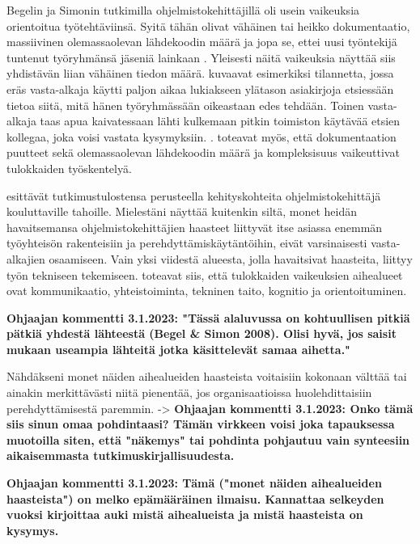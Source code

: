 \documentclass[utf8]{gradu3}
\begin{document}
Begelin ja Simonin tutkimilla ohjelmistokehittäjillä oli usein vaikeuksia orientoitua työtehtäviinsä. Syitä tähän olivat vähäinen tai heikko dokumentaatio, massiivinen olemassaolevan lähdekoodin määrä ja jopa se, ettei uusi työntekijä tuntenut työryhmänsä jäseniä lainkaan \parencite{begel-simon-2008}. Yleisesti näitä vaikeuksia näyttää siis yhdistävän liian vähäinen tiedon määrä. \textcite{begel-simon-2008} kuvaavat esimerkiksi tilannetta, jossa eräs vasta-alkaja käytti paljon aikaa lukiakseen ylätason asiakirjoja etsiessään tietoa siitä, mitä hänen työryhmässään oikeastaan edes tehdään. Toinen vasta-alkaja taas apua kaivatessaan lähti kulkemaan pitkin toimiston käytävää etsien kollegaa, joka voisi vastata kysymyksiin. \parencite{begel-simon-2008}. \textcite{britto-ym-2019} toteavat myös, että dokumentaation puutteet sekä olemassaolevan lähdekoodin määrä ja kompleksisuus vaikeuttivat tulokkaiden työskentelyä.


\textcite{begel-simon-2008} esittävät tutkimustulostensa perusteella kehityskohteita ohjelmistokehittäjä kouluttaville tahoille. Mielestäni näyttää kuitenkin siltä, monet heidän havaitsemansa ohjelmistokehittäjien haasteet liittyvät itse asiassa enemmän työyhteisön rakenteisiin ja perehdyttämiskäytäntöihin, eivät varsinaisesti vasta-alkajien osaamiseen. Vain yksi viidestä alueesta, jolla \textcite{begel-simon-2008} havaitsivat haasteita, liittyy työn tekniseen tekemiseen. \textcite{begel-simon-2008} toteavat siis, että tulokkaiden vaikeuksien aihealueet ovat kommunikaatio, yhteistoiminta, tekninen taito, kognitio ja orientoituminen. 

\textbf{Ohjaajan kommentti 3.1.2023: "Tässä alaluvussa on kohtuullisen pitkiä pätkiä yhdestä lähteestä (Begel & Simon 2008). Olisi hyvä, jos saisit mukaan useampia lähteitä jotka käsittelevät samaa aihetta."}

Nähdäkseni monet näiden aihealueiden haasteista voitaisiin kokonaan välttää tai ainakin merkittävästi niitä pienentää, jos organisaatioissa huolehdittaisiin perehdyttämisestä paremmin.
->
\textbf{Ohjaajan kommentti 3.1.2023: Onko tämä siis sinun omaa pohdintaasi? Tämän virkkeen voisi joka tapauksessa muotoilla siten, että "näkemys" tai pohdinta pohjautuu vain synteesiin aikaisemmasta tutkimuskirjallisuudesta. }

\textbf{Ohjaajan kommentti 3.1.2023: Tämä ("monet näiden aihealueiden haasteista") on melko epämääräinen ilmaisu. Kannattaa selkeyden vuoksi kirjoittaa auki mistä aihealueista ja mistä haasteista on kysymys. }
\end{document}
